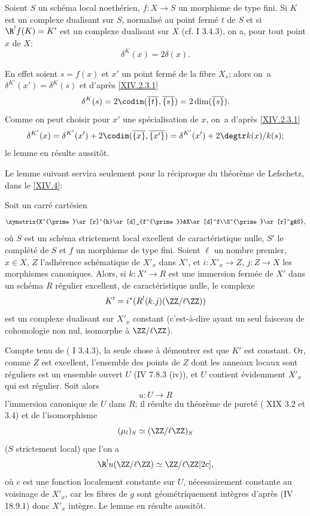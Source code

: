 \begin{sublemme} \label{XIV.2.3.2} Soient $S$ un sch\'ema local noeth\'erien, $f:X\to S$ un morphisme de type fini. Si $K$ est un complexe dualisant sur $S$, normalis\'e au point ferm\'e $t$ de $S$ et si $\R^!f(K)=K'$ est un complexe dualisant sur $X$ (cf.  I 3.4.3), on a, pour tout point $x$ de $X$:$$
\delta^{K}(x)=2\delta(x).
$$
\end{sublemme}

En effet soient $s=f(x)$ et $x'$ un point ferm\'e de la fibre $X_s$; alors on~a $\delta^{K'}(x')=\delta^K(s)$ et d'apr\`es \ref{XIV.2.3.1}
$$
\delta^K(s)=2\codim(\overline{\{t\}}, \overline{\{s\}})=2\dim(\overline{\{s\}}).
$$
Comme on peut choisir pour $x'$ une sp\'ecialisation de $x$, on~a d'apr\`es \ref{XIV.2.3.1}
$$
\delta^{K'}(x)=\delta^{K'}(x')+2\codim(\overline{\{x\}}, \overline{\{x'\}})=\delta^{K'}(x')+2\degtr k(x)/k(s);$$
le lemme en r\'esulte aussit\^{o}t.

Le lemme suivant servira seulement pour la r\'eciproque du th\'eor\`eme de Lefschetz, dans le \numero\ref{XIV.4}:

\begin{sublemme} \label{XIV.2.3.3}
Soit un carr\'e cart\'esien
$$
\xymatrix{X^{\prime}\ar[r]^{h}\ar[d]_{f^{\prime}}&X\ar[d]^f\\S^{\prime}\ar[r]^g&S},
$$
o\`u $S$ est un sch\'ema strictement local excellent de caract\'eristique nulle, $S'$ le compl\'et\'e de $S$ et $f$ un morphisme de type fini. Soient $\ell$ un nombre premier, $x\in X$, $Z$ l'adh\'erence sch\'ematique de $X'_x$ dans $X'$, et $i:X'_x\to Z$, $j:Z\to X$ les morphismes canoniques. Alors, si $k:X'\to R$ est une immersion ferm\'ee de $X'$ dans un sch\'ema $R$ r\'egulier excellent, de caract\'eristique nulle, le complexe
$$K'=i^*(R^!(k.j)(\ZZ/\ell\ZZ))$$
est un complexe dualisant sur $X'_x$ constant (c'est-\`a-dire ayant un seul faisceau de cohomologie non nul, isomorphe \`a $\ZZ/\ell\ZZ$).
\end{sublemme}

\enlargethispage{\baselineskip}%
Compte tenu de ( I 3.4.3), la seule chose \`a d\'emontrer est que $K'$ est constant. Or, comme $Z$ est excellent, l'ensemble des points de $Z$ dont les anneaux locaux sont r\'eguliers est un ensemble ouvert $U$ (\EGA IV 7.8.3 \textup{(iv)}), et $U$ contient \'evidemment $X'_x$ qui est r\'egulier. Soit alors
$$u:U\to R$$
l'immersion canonique de $U$ dans $R$; il r\'esulte du th\'eor\`eme de puret\'e ( XIX 3.2 et 3.4) et de l'isomorphisme
$$(\mu_l)_S\simeq(\ZZ/\ell\ZZ)_S$$
($S$ strictement local) que l'on a
$$
\R^!u(\ZZ/\ell\ZZ)\simeq\ZZ/\ell\ZZ[2c],
$$
o\`u $c$ est une fonction localement constante sur $U$, n\'ecessairement constante au voisinage de $X'_x$, car les fibres de $g$ sont g\'eom\'etriquement int\`egres d'apr\`es (\EGA IV 18.9.1) donc $X'_x$ int\`egre. Le lemme en r\'esulte aussit\^{o}t.

